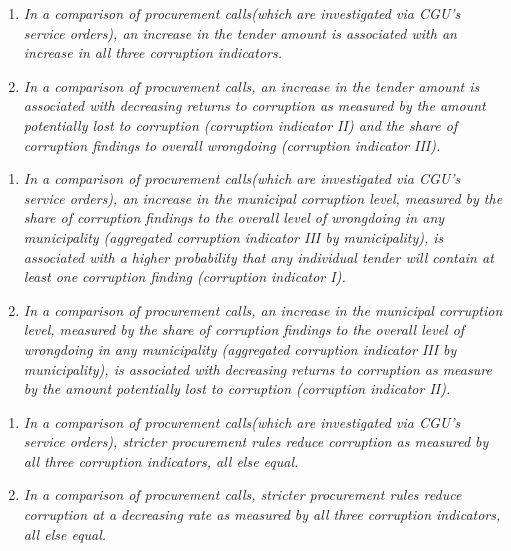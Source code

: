 \documentclass[11pt]{article}
\newcommand{\hypopen}{In a comparison of procurement calls}
\begin{document}
\begin{enumerate}[label = H\arabic{enumi}:, font = \bfseries, labelindent = \parindent, leftmargin = *] %
  \item \emph{\hypopen \space (which are investigated via CGU's service orders), an increase in the tender amount is associated with an increase in all three corruption indicators.}
  \item \emph{\hypopen, an increase in the tender amount is associated with decreasing returns to corruption as measured by the amount potentially lost to corruption (corruption indicator II) and the share of corruption findings to overall wrongdoing (corruption indicator III).}
\end{enumerate}
\begin{enumerate}[label = H\arabic{enumi}:, font = \bfseries, labelindent = \parindent, leftmargin = *, resume] %
  \item \emph{\hypopen \space (which are investigated via CGU's service orders), an increase in the municipal corruption level, measured by the share of corruption findings to the overall level of wrongdoing in any municipality (aggregated corruption indicator III by municipality), is associated with a higher probability that any individual tender will contain at least one corruption finding (corruption indicator I).}
  \item \emph{\hypopen, an increase in the municipal corruption level, measured by the share of corruption findings to the overall level of wrongdoing in any municipality (aggregated corruption indicator III by municipality), is associated with decreasing returns to corruption as measure by the amount potentially lost to corruption (corruption indicator II).}
\end{enumerate}
\begin{enumerate}[label = H\arabic{enumi}:, font = \bfseries, labelindent = \parindent, leftmargin = *, resume] %
  \item \textit{\hypopen \space (which are investigated via CGU's service orders), stricter procurement rules reduce corruption as measured by all three corruption indicators, \emph{all else equal}.}
  \item \textit{\hypopen, stricter procurement rules reduce corruption at a decreasing rate as measured by all three corruption indicators, \emph{all else equal}.}
\end{enumerate}
\end{document}
